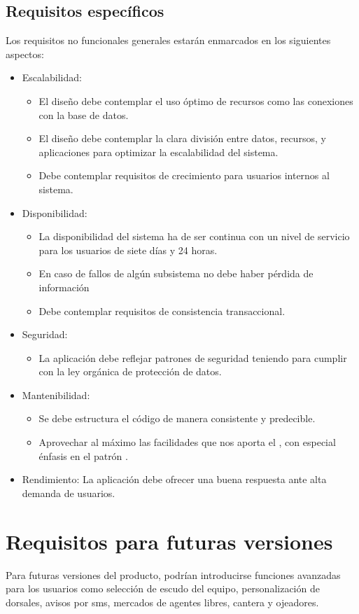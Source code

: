 \subsection{Requisitos específicos}
Los requisitos no funcionales generales estarán enmarcados en los siguientes
aspectos:
\begin{itemize}
\item Escalabilidad:
  \begin{itemize}
  \item El diseño debe contemplar el uso óptimo de recursos como las conexiones
    con la base de datos.
  \item El diseño debe contemplar la clara división entre datos, recursos, y
    aplicaciones para optimizar la escalabilidad del sistema.
  \item Debe contemplar requisitos de crecimiento para usuarios internos al
    sistema.
  \end{itemize}
\item Disponibilidad:
  \begin{itemize}
  \item La disponibilidad del sistema ha de ser continua con un nivel de
    servicio para los usuarios de siete días y 24 horas.
  \item En caso de fallos de algún subsistema no debe haber pérdida de
    información
  \item Debe contemplar requisitos de consistencia transaccional.
  \end{itemize}
\item Seguridad:
  \begin{itemize}
  \item La aplicación debe reflejar patrones de seguridad teniendo para cumplir
    con la ley orgánica de protección de datos.
  \end{itemize}
\item Mantenibilidad:
  \begin{itemize}
  \item Se debe estructura el código de manera consistente y predecible.
  \item Aprovechar al máximo las facilidades que nos aporta el
    , con especial énfasis en el patrón
    .
  \end{itemize}
\item Rendimiento: La aplicación debe ofrecer una buena respuesta ante alta
  demanda de usuarios.
\end{itemize}
\section{Requisitos para futuras versiones}
Para futuras versiones del producto, podrían introducirse funciones avanzadas
para los usuarios como selección de escudo del equipo, personalización de
dorsales, avisos por sms, mercados de agentes
libres, cantera y ojeadores.\\

